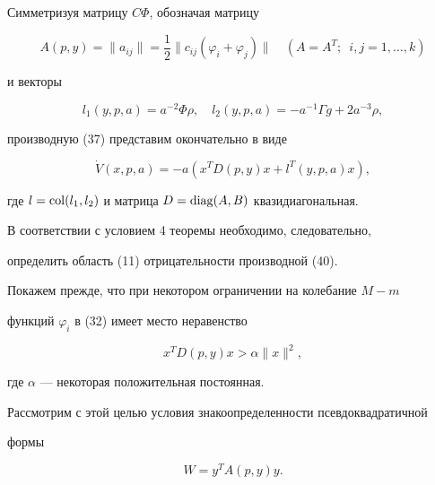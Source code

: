 Симметризуя матрицу $C\Phi$, обозначая матрицу 


\begin{equation} 


A(p,y)=\|a_{ij}\|=\frac{1}{2}\|c_{ij}(\varphi_i+\varphi_j)\|\quad 


(A=A^T;\ \; i,j=1,\dotsc,k)


\end{equation} 


и векторы 


\begin{equation} 


l_1(y,p,a)=a^{-2}\Phi\rho,\quad 


l_2(y,p,a)=-a^{-1}\Gamma g+2a^{-3}\rho, 


\end{equation} 


производную (37) представим окончательно в виде 


\begin{equation} 


\Dot V(x,p,a)=-a(x^T D(p,y)x+l^T(y,p,a)x), 


\end{equation} 


где $l=\operatorname{col}(l_1,l_2)$ и матрица $D=\operatorname{diag}(A,B)$ квазидиагональная. 


 


В соответствии с условием 4 теоремы необходимо, следовательно,  


определить область (11) отрицательности производной (40). 


 


Покажем прежде, что при некотором ограничении на колебание $M{-}m$ 


функций $\varphi_i$ в (32) имеет место неравенство 


\begin{equation} 


x^T D(p,y)x>\alpha\|x\|^2, 


\end{equation} 


где $\alpha$ --- некоторая положительная постоянная. 


Рассмотрим с этой целью условия знакоопределенности псевдоквадратичной  


формы 


\begin{equation} 


W=y^T A(p,y)y. 


\end{equation} 


